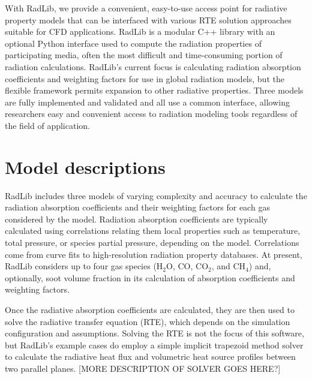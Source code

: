 \documentclass[preprint,12pt, a4paper]{elsarticle}
\begin{document}

With RadLib, we provide a convenient, easy-to-use access point for radiative property models that can be interfaced with various RTE solution approaches suitable for CFD applications. RadLib is a modular C++ library with an optional Python interface used to compute the radiation properties of participating media, often the most difficult and time-consuming portion of radiation calculations. RadLib's current focus is calculating radiation absorption coefficients and weighting factors for use in global radiation models, but the flexible framework permits expansion to other radiative properties. Three models are fully implemented and validated and all use a common interface, allowing researchers easy and convenient access to radiation modeling tools regardless of the field of application.

\section{Model descriptions}
\label{s:models}

RadLib includes three models of varying complexity and accuracy to calculate the radiation absorption coefficients and their weighting factors for each gas considered by the model. Radiation absorption coefficients are typically calculated using correlations relating them local properties such as temperature, total pressure, or species partial pressure, depending on the model. Correlations come from curve fits to high-resolution radiation property databases. At present, RadLib considers up to four gas species (H$_2$O, CO, CO$_2$, and CH$_4$) and, optionally, soot volume fraction in its calculation of absorption coefficients and weighting factors. 

Once the radiative absorption coefficients are calculated, they are then used to solve the radiative transfer equation (RTE), which depends on the simulation configuration and assumptions. Solving the RTE is not the focus of this software, but RadLib's example cases do employ a simple implicit trapezoid method solver to calculate the radiative heat flux and volumetric heat source profiles between two parallel planes. [MORE DESCRIPTION OF SOLVER GOES HERE?]
\end{document}

